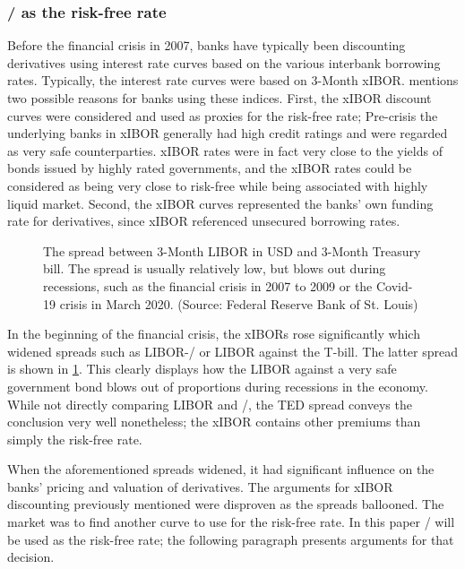 \documentclass[main.tex]{subfiles}
\begin{document}
    \subsubsection{\OIS/ as the risk-free rate}
    
    Before the financial crisis in 2007, banks have typically been discounting
    derivatives using interest rate curves based on the various interbank borrowing rates.
    Typically, the interest rate curves were based on 3-Month xIBOR.
    \textcite[Section 8.6]{Green2015XVA} 
    mentions two possible reasons for banks using these indices.
    First, the xIBOR discount curves were considered and used as proxies for the risk-free rate;
    Pre-crisis the underlying banks in xIBOR generally had high credit ratings
    and were regarded as very safe counterparties.
    xIBOR rates were in fact very close to the yields of bonds issued by highly rated governments,
    and the xIBOR rates could be considered as being very close to risk-free 
    while being associated with highly liquid market.
    Second, the xIBOR curves represented the banks' own funding rate for derivatives, since
    xIBOR referenced unsecured borrowing rates.

    \begin{figure}
        \centering
        \resizebox{\textwidth}{!}{%
            
        }
        \caption{
            The spread between 3-Month LIBOR in USD and 3-Month Treasury bill.
            The spread is usually relatively low, 
            but blows out during recessions, 
            such as the financial crisis in 2007 to 2009 or
            the Covid-19 crisis in March 2020.
            (Source: Federal Reserve Bank of St. Louis)
        }
        \label{fig:ted-spread}
    \end{figure}

    In the beginning of the financial crisis, the xIBORs rose significantly
    which widened spreads such as LIBOR-\OIS/ or LIBOR against the T-bill.
    The latter spread is shown in \cref{fig:ted-spread}. This clearly 
    displays how the LIBOR against a very safe government bond blows out of proportions
    during recessions in the economy. 
    While not directly comparing LIBOR and \OIS/, 
    the TED spread conveys the conclusion very well nonetheless;
    the xIBOR contains other premiums than simply the risk-free rate.

    When the aforementioned spreads widened, 
    it had significant influence on the banks' pricing and valuation of derivatives.
    The arguments for xIBOR discounting previously mentioned
    were disproven as the spreads ballooned.
    The market was to find another curve to use for the risk-free rate.
    In this paper \OIS/ will be used as the risk-free rate;
    the following paragraph presents arguments for that decision.
\end{document}
